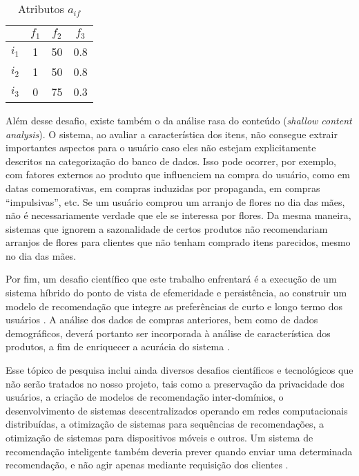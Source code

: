 \begin{table}[h]
\begin{center}
    \caption{Atributos $a_{if}$}
    \label{tab:aif_overspec}
    \begin{tabular}{ | c | c | c | c | } 
    \hline
     & $f_1$ & $f_2$ & $f_3$ \\ \hline
     $i_1$ & 1 & 50 & 0.8 \\ \hline
     $i_2$ & 1 & 50 & 0.8 \\ \hline
     $i_3$ & 0 & 75 & 0.3 \\ \hline
    \end{tabular}
\end{center}
\end{table}

Além desse desafio, existe também o da análise rasa do conteúdo (\textit{shallow content analysis}). O sistema, ao avaliar a característica dos itens, não consegue extrair importantes aspectos para o usuário caso eles não estejam explicitamente descritos na categorização do banco de dados. Isso pode ocorrer, por exemplo, com fatores externos ao produto que influenciem na compra do usuário, como em datas comemorativas, em compras induzidas por propaganda, em compras ``impulsivas'', etc. Se um usuário comprou um arranjo de flores no dia das mães, não é necessariamente verdade que ele se interessa por flores. Da mesma maneira, sistemas que ignorem a sazonalidade de certos produtos não recomendariam arranjos de flores para clientes que não tenham comprado itens parecidos, mesmo no dia das mães.

Por fim, um desafio científico que este trabalho enfrentará é a execução de um sistema híbrido do ponto de vista de efemeridade e persistência, ao construir um modelo de recomendação que integre as preferências de curto e longo termo dos usuários \cite{schafer1999recommender}. A análise dos dados de compras anteriores, bem como de dados demográficos, deverá portanto ser incorporada à análise de característica dos produtos, a fim de enriquecer a acurácia do sistema \cite{wei2007survey}.

Esse tópico de pesquisa inclui ainda diversos desafios científicos e tecnológicos que não serão tratados no nosso projeto, tais como a preservação da privacidade dos usuários, a criação de modelos de recomendação inter-domínios, o desenvolvimento de sistemas descentralizados operando em redes computacionais distribuídas, a otimização de sistemas para sequências de recomendações, a otimização de sistemas para dispositivos móveis e outros. Um sistema de recomendação inteligente também deveria prever quando enviar uma determinada recomendação, e não agir apenas mediante requisição dos clientes \cite{lops2011content}.


